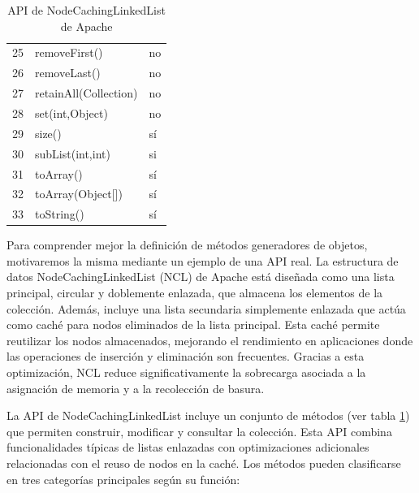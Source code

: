 \begin{table}[]
{\begin{tabular}{|l|l|l|}
25 & removeFirst() & no \\
26 & removeLast() & no \\
27 & retainAll(Collection) & no \\
28 & set(int,Object) & no \\
29 & size() & sí \\
30 & subList(int,int) & si \\
31 & toArray() & sí \\
32 & toArray(Object[]) & sí \\
33 & toString() & sí \\
\hline
\end{tabular}
}
\caption{API de NodeCachingLinkedList de Apache}
\label{tab:ncl-api}
\end{table}


Para comprender mejor la definición de métodos generadores de objetos, motivaremos la misma mediante un ejemplo de una API real. La estructura de datos NodeCachingLinkedList (NCL) de Apache \cite{apache} está diseñada como una lista principal, circular y doblemente enlazada, que almacena los elementos de la colección. Además, incluye una lista secundaria simplemente enlazada que actúa como caché para nodos eliminados de la lista principal. Esta caché permite reutilizar los nodos almacenados, mejorando el rendimiento en aplicaciones donde las operaciones de inserción y eliminación son frecuentes. Gracias a esta optimización, NCL reduce significativamente la sobrecarga asociada a la asignación de memoria y a la recolección de basura. 

La API de NodeCachingLinkedList incluye un conjunto de métodos (ver tabla \ref{tab:ncl-api}) que permiten construir, modificar y consultar la colección. Esta API combina funcionalidades típicas de listas enlazadas con optimizaciones adicionales relacionadas con el reuso de nodos en la caché. Los métodos pueden clasificarse en tres categorías principales según su función: 

